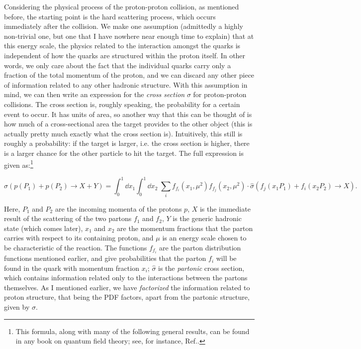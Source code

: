Considering the physical process of the proton-proton collision, as mentioned before, the starting point is the hard scattering process, which occurs immediately after the collision. We make one assumption (admittedly a highly non-trivial one, but one that I have nowhere near enough time to explain) that at this energy scale, the physics related to the interaction amongst the quarks is independent of how the quarks are structured within the proton itself. In other words, we only care about the fact that the individual quarks carry only a fraction of the total momentum of the proton, and we can discard any other piece of information related to any other hadronic structure. With this assumption in mind, we can then write an expression for the \textit{cross section} $\sigma$ for proton-proton collisions. The cross section is, roughly speaking, the probability for a certain event to occur. It has units of area, so another way that this can be thought of is how much of a cross-sectional area the target provides to the other object (this is actually pretty much exactly what the cross section is). Intuitively, this still is roughly a probability: if the target is larger, i.e. the cross section is higher, there is a larger chance for the other particle to hit the target. The full expression is given as:\footnote{This formula, along with many of the following general results, can be found in any book on quantum field theory; see, for instance, Ref.\cite{peskin-schroeder}.}

\begin{equation}
  \sigma(p(P_1) + p(P_2) \rightarrow X + Y) = \int_0^1 \dd x_1 \int_0^1 \dd x_2 \; \sum_i f_{f_i}(x_1, \mu^2) f_{f_j}(x_2, \mu^2) \cdot \hat{\sigma}(f_j(x_1 P_1) + f_i(x_2 P_2) \rightarrow X).\label{eq:cross-section}
\end{equation}

Here, $P_1$ and $P_2$ are the incoming momenta of the protons $p$, $X$ is the immediate result of the scattering of the two partons $f_1$ and $f_2$, $Y$ is the generic hadronic state (which comes later), $x_1$ and $x_2$ are the momentum fractions that the parton carries with respect to its containing proton, and $\mu$ is an energy scale chosen to be characteristic of the reaction. The functions $f_{f_i}$ are the parton distribution functions mentioned earlier, and give probabilities that the parton $f_i$ will be found in the quark with momentum fraction $x_i$; $\hat{\sigma}$ is the \textit{partonic} cross section, which contains information related only to the interactions between the partons themselves. As I mentioned earlier, we have \textit{factorized} the information related to proton structure, that being the PDF factors, apart from the partonic structure, given by $\hat{\sigma}$.

